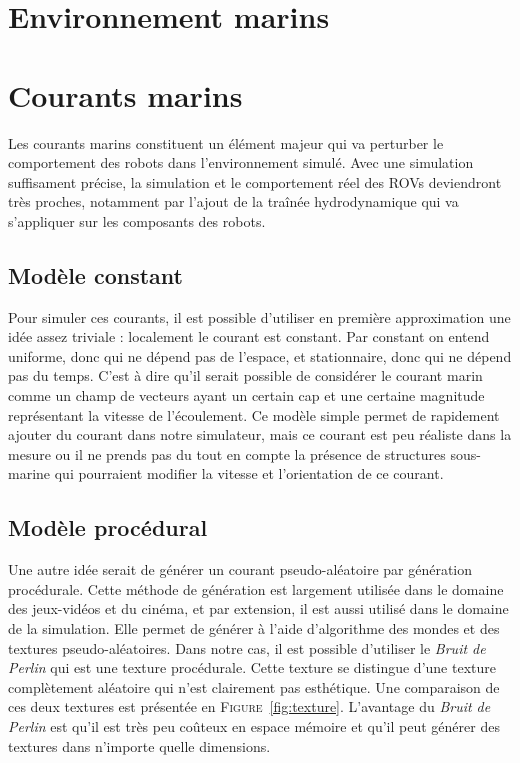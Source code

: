 	\section{Environnement marins}

		\section{Courants marins}

			Les courants marins constituent un élément majeur qui va perturber le comportement des robots dans l'environnement simulé. Avec une simulation suffisament précise, la simulation et le comportement réel des \gls{ROV}s deviendront très proches, notamment par l'ajout de la traînée hydrodynamique qui va s'appliquer sur les composants des robots.

			\subsection{Modèle constant}

				Pour simuler ces courants, il est possible d'utiliser en première approximation une idée assez triviale : localement le courant est constant. Par constant on entend uniforme, donc qui ne dépend pas de l'espace, et stationnaire, donc qui ne dépend pas du temps. C'est à dire qu'il serait possible de considérer le courant marin  comme un champ de vecteurs ayant un certain cap et une certaine magnitude représentant la vitesse de l'écoulement. Ce modèle simple permet de rapidement ajouter du courant dans notre simulateur, mais ce courant est peu réaliste dans la mesure ou il ne prends pas du tout en compte la présence de structures sous-marine qui pourraient modifier la vitesse et l'orientation de ce courant.

			\subsection{Modèle procédural}

				Une autre idée serait de générer un courant pseudo-aléatoire par génération procédurale. Cette méthode de génération est largement utilisée dans le domaine des jeux-vidéos et du cinéma, et par extension, il est aussi utilisé dans le domaine de la simulation. Elle permet de générer à l'aide d'algorithme des mondes et des textures pseudo-aléatoires. Dans notre cas, il est possible d'utiliser le \textit{Bruit de Perlin} qui est une texture procédurale. Cette texture se distingue d'une texture complètement aléatoire qui n'est clairement pas esthétique. Une comparaison de ces deux textures est présentée en \textsc{Figure}~\ref{fig:texture}. L'avantage du \textit{Bruit de Perlin} est qu'il est très peu coûteux en espace mémoire et qu'il peut générer des textures dans n'importe quelle dimensions. 
				
